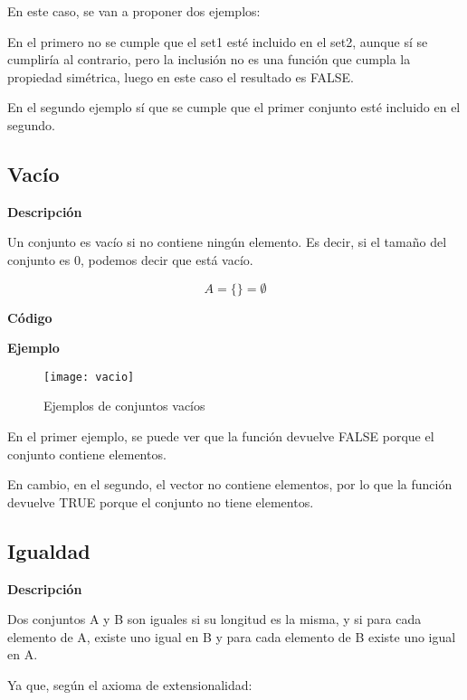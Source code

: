     En este caso, se van a proponer dos ejemplos:

    En el primero no se cumple que el set1 est\'e incluido en el set2, aunque s\'i se cumplir\'ia al contrario, pero la inclusi\'on no es 
    una funci\'on que cumpla la propiedad sim\'etrica, luego en este caso el resultado es FALSE.

    En el segundo ejemplo s\'i que se cumple que el primer conjunto est\'e incluido en el segundo.



\subsection{Vac\'io}

    \textbf{Descripci\'on}

    Un conjunto es vac\'io si no contiene ning\'un elemento. Es decir, si el tama\~no del conjunto es 0, 
    podemos decir que est\'a vac\'io. 

    \[
        A = \{ \} = \emptyset
    \]

    \textbf{C\'odigo}

    
    \bigskip

    \textbf{Ejemplo}

    \begin{figure}[H]
        \centering
        \texttt{[image: vacio]}
        \caption{Ejemplos de conjuntos vac\'ios}
        \label{fig:vacio}
    \end{figure}

    En el primer ejemplo, se puede ver que la funci\'on devuelve FALSE porque el conjunto contiene elementos.

    En cambio, en el segundo, el vector no contiene elementos, por lo que la funci\'on devuelve TRUE porque el conjunto no tiene 
    elementos.



\subsection{Igualdad}

    \textbf{Descripci\'on}

    Dos conjuntos A y B son iguales si su longitud es la misma, y si para cada elemento de A, existe uno igual 
    en B y para cada elemento de B existe uno igual en A.

    Ya que, seg\'un el axioma de extensionalidad:

